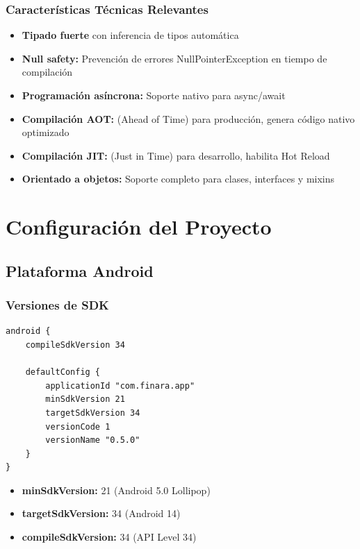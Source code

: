 \subsubsection{Características Técnicas Relevantes}

\begin{itemize}
    \item \textbf{Tipado fuerte} con inferencia de tipos automática
    \item \textbf{Null safety:} Prevención de errores NullPointerException en tiempo de compilación
    \item \textbf{Programación asíncrona:} Soporte nativo para async/await
    \item \textbf{Compilación AOT:} (Ahead of Time) para producción, genera código nativo optimizado
    \item \textbf{Compilación JIT:} (Just in Time) para desarrollo, habilita Hot Reload
    \item \textbf{Orientado a objetos:} Soporte completo para clases, interfaces y mixins
\end{itemize}

\section{Configuración del Proyecto}

\subsection{Plataforma Android}

\subsubsection{Versiones de SDK}

\begin{lstlisting}[caption=Configuración en build.gradle]
android {
    compileSdkVersion 34
    
    defaultConfig {
        applicationId "com.finara.app"
        minSdkVersion 21
        targetSdkVersion 34
        versionCode 1
        versionName "0.5.0"
    }
}
\end{lstlisting}

\begin{itemize}
    \item \textbf{minSdkVersion:} 21 (Android 5.0 Lollipop) \cite{android_versions}
    \item \textbf{targetSdkVersion:} 34 (Android 14)
    \item \textbf{compileSdkVersion:} 34 (API Level 34)
\end{itemize}

